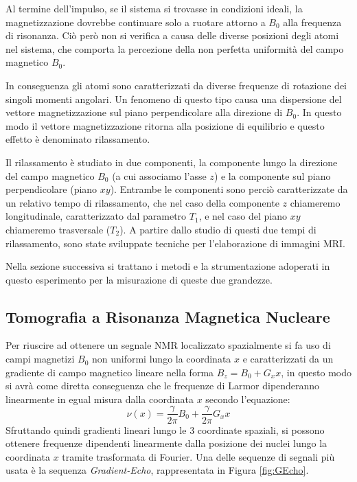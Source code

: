 Al termine dell'impulso, se il sistema si trovasse in condizioni ideali, la magnetizzazione dovrebbe continuare solo a ruotare attorno a $B_0$ alla frequenza di risonanza. 
Ciò però non si verifica a causa delle diverse posizioni degli atomi nel sistema, che comporta la percezione della non perfetta uniformità del campo magnetico $B_0$. 

In conseguenza gli atomi sono caratterizzati da diverse frequenze di rotazione dei singoli momenti angolari.
Un fenomeno di questo tipo causa una dispersione del vettore magnetizzazione sul piano perpendicolare alla direzione di $B_0$.
In questo modo il vettore magnetizzazione ritorna alla posizione di equilibrio e questo effetto è denominato rilassamento.

Il rilassamento è studiato in due componenti, la componente lungo la direzione del campo magnetico $B_0$ (a cui associamo l'asse $z$) e la componente sul piano perpendicolare (piano $xy$). 
Entrambe le componenti sono perciò caratterizzate da un relativo tempo di rilassamento, che nel caso della componente $z$ chiameremo longitudinale, caratterizzato dal parametro $T_1$, e nel caso del piano $xy$ chiameremo trasversale ($T_2$).
A partire dallo studio di questi due tempi di rilassamento, sono state sviluppate tecniche per l'elaborazione di immagini MRI.

Nella sezione successiva si trattano i metodi e la strumentazione adoperati in questo esperimento per la misurazione di queste due grandezze.

\subsection*{Tomografia a Risonanza Magnetica Nucleare}

Per riuscire ad ottenere un segnale NMR localizzato spazialmente si fa uso di campi magnetizi $B_0$ non uniformi lungo la coordinata $x$ e caratterizzati da un gradiente di campo magnetico lineare nella forma $B_z = B_0 + G_x x$, in questo modo si avrà come diretta conseguenza che le frequenze di Larmor dipenderanno linearmente in egual misura dalla coordinata $x$ secondo l'equazione:
\begin{equation}
	\nu(x) = \frac{\gamma}{2\pi}B_0 + \frac{\gamma}{2\pi}G_x x
\end{equation}
Sfruttando quindi gradienti lineari lungo le 3 coordinate spaziali, si possono ottenere frequenze dipendenti linearmente dalla posizione dei nuclei lungo la coordinata $x$ tramite trasformata di Fourier. Una delle sequenze di segnali più usata è la sequenza \textit{Gradient-Echo}, rappresentata in Figura \ref{fig:GEcho}.

